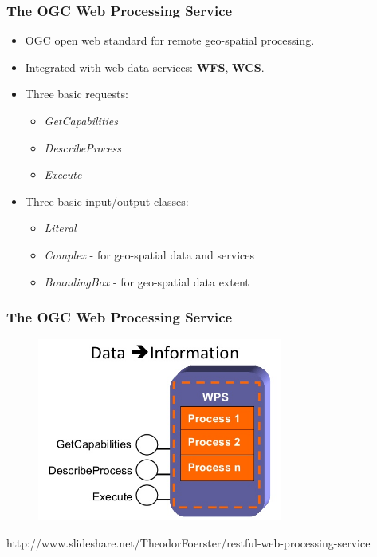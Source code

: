 \documentclass{beamer}
\begin{document}
\begin{frame}
\frametitle<presentation>{The OGC Web Processing Service}

\begin{itemize}
\item OGC open web standard for remote geo-spatial processing.
\item Integrated with web data services: \textbf{WFS}, \textbf{WCS}.
\item Three basic requests:
\begin{itemize}   
      \item  \textit{GetCapabilities}
      \item  \textit{DescribeProcess}
      \item  \textit{Execute}
\end{itemize}
\item Three basic input/output classes:
\begin{itemize}   
      \item  \textit{Literal}
      \item  \textit{Complex} - for geo-spatial data and services
      \item  \textit{BoundingBox} - for geo-spatial data extent
\end{itemize}
\end{itemize}
\end{frame}



\begin{frame}
\frametitle<presentation>{The OGC Web Processing Service}

  \begin{figure}[ht]
   \centering
   \includegraphics[height=6cm]{figures/WPS}
  \end{figure}

\centering
\footnotesize{http://www.slideshare.net/TheodorFoerster/restful-web-processing-service}

\end{frame}
\end{document}

